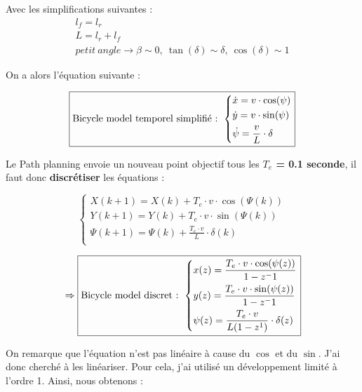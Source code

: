 \documentclass[a4paper,12pt]{extarticle}
\begin{document}
Avec les simplifications suivantes :
\begin{equation*}
    \begin{array}{l}
        l_f=l_r\\
        L=l_r+l_f\\
        petit \ angle \rightarrow \beta \sim 0 , \ \tan(\delta) \sim \delta , \ \cos(\delta) \sim 1
    \end{array}
\end{equation*}

On a alors l'équation suivante :

\begin{equation}
\boxed{
    \text{Bicycle model temporel simplifié : }
    \begin{dcases}
        \dot{x} = v\cdot\cos(\psi) \\
        \dot{y} = v\cdot\sin(\psi) \\
        \dot{\psi} = \frac{v}{L}\cdot\delta \\
    \end{dcases}
}
\end{equation}

Le Path planning envoie un nouveau point objectif tous les \textbf{$T_e$ = 0.1 seconde}, il faut donc \textbf{discrétiser} les équations :

\begin{equation*}
     \begin{cases}
        X(k+1) = X(k) + T_e\cdot v\cdot\cos(\Psi(k)) \\
        Y(k+1) = Y(k) + T_e\cdot v\cdot\sin(\Psi(k)) \\
        \Psi(k+1) = \Psi(k) + \frac{T_e\cdot v}{L}\cdot\delta(k) \\
    \end{cases}
\end{equation*}

\begin{equation}
    \left .
    \Rightarrow
    \right . 
\boxed{
    \text{Bicycle model discret : }
    \begin{dcases}
        x(z) = \frac{T_e\cdot v\cdot\cos(\psi(z))}{1-z^-1} \\
        y(z) = \frac{T_e\cdot v\cdot\sin(\psi(z))}{1-z^-1} \\
        \psi(z) = \frac{T_e\cdot v}{L(1-z^1)}\cdot\delta(z) \\
    \end{dcases}
}
\end{equation}

On remarque que l'équation n'est pas linéaire à cause du $\cos$ et du $\sin$. J'ai donc cherché à les linéariser. Pour cela, j'ai utilisé un développement limité à l'ordre 1.
Ainsi, nous obtenons : 
\end{document}

